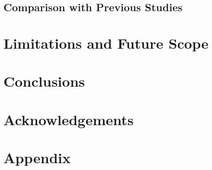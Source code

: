 \documentclass[12pt]{article}
\begin{document}
\subsection{Comparison with Previous Studies}

\section{Limitations and Future Scope}

\section{Conclusions}

\section*{Acknowledgements}



\clearpage
\appendix
\renewcommand{\thetable}{A\arabic{table}}
\renewcommand{\thefigure}{A\arabic{figure}}
\setcounter{table}{0}
\setcounter{figure}{0}
\section*{Appendix}
\end{document}
